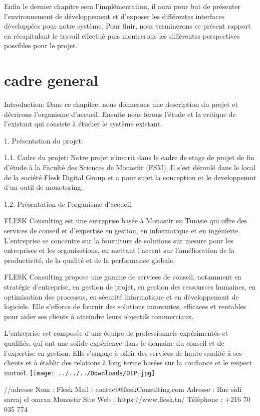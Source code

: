 \documentclass{report}
\begin{document}
Enfin le dernier chapitre sera l’implémentation, il aura pour but de présenter l’environnement 
de développement et d’exposer les différentes interfaces développées pour notre système.
Pour finir, nous terminerons ce présent rapport en récapitulant le travail effectué puis 
montrerons les différentes perspectives possibles pour le projet.
\section{cadre general}
Introduction:
Dans ce chapitre, nous donnerons une description du projet et décrirons l’organisme d’accueil.
Ensuite nous ferons l’étude et la critique de l’existant qui consiste à étudier le système existant.

1. Présentation du projet:

1.1. Cadre du projet:
Notre projet s’inscrit dans le cadre de stage de projet de fin d’étude à la Faculté des Sciences de Monastir (FSM). Il s’est déroulé dans le local de la société Flesk Digital Group et a pour sujet la conception et le developpemnt d'un outil de monotoring.

1.2. Présentation de l’organisme d’accueil:

FLESK Consulting est une entreprise basée à Monastir en Tunisie qui offre des services de conseil et d'expertise en gestion, en informatique et en ingénierie. L'entreprise se concentre sur la fourniture de solutions sur mesure pour les entreprises et les organisations, en mettant l'accent sur l'amélioration de la productivité, de la qualité et de la performance globale.

FLESK Consulting propose une gamme de services de conseil, notamment en stratégie d'entreprise, en gestion de projet, en gestion des ressources humaines, en optimisation des processus, en sécurité informatique et en développement de logiciels. Elle s'efforce de fournir des solutions innovantes, efficaces et rentables pour aider ses clients à atteindre leurs objectifs commerciaux.

L'entreprise est composée d'une équipe de professionnels expérimentés et qualifiés, qui ont une solide expérience dans le domaine du conseil et de l'expertise en gestion. Elle s'engage à offrir des services de haute qualité à ses clients et à établir des relations à long terme basées sur la confiance et le respect mutuel.
 \texttt{[image: ../../../Downloads/OIP.jpg]} 

//adresse
 Nom : Flesk
 Mail : contact@fleskConsulting.com
 Adresse : Rue sidi sarraj el omran Monastir
 Site Web : https://www.flesk.tn/
 Téléphone : +216 70 035 774
 
\end{document}

